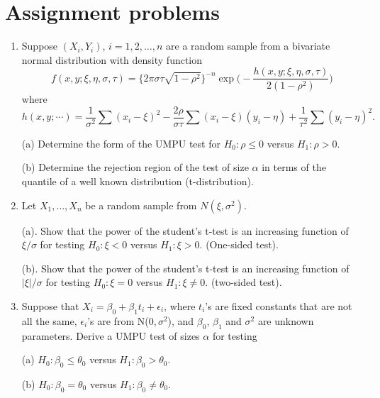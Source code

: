 \section{Assignment problems}
\begin{enumerate}
\item
Suppose $(X_i, Y_i)$, $i=1, 2, \ldots, n$ are a random sample from 
a bivariate normal  distribution with density function
\[
f(x, y; \xi, \eta, \sigma, \tau) 
=
\big \{2\pi \sigma \tau \sqrt{1-\rho^2} \big \}^{-n} 
\exp
\big ( 
- \frac{h(x, y ; \xi, \eta, \sigma, \tau)}{2(1-\rho^2)}
\big )
\]
where
\[
h(x, y ; \cdots)
=
\frac{1}{\sigma^2} \sum(x_i - \xi)^2 
- \frac{2 \rho}{\sigma \tau} \sum(x_i - \xi)(y_i - \eta)
+ \frac{1}{\tau^2}\sum (y_i - \eta)^2.
\]

(a) Determine the form of the UMPU test for $H_0: \rho \leq 0$ 
versus $H_1: \rho > 0$.

(b) Determine the rejection region of the
test of size $\alpha$ in terms of the quantile of 
a well known distribution (t-distribution).

\item
Let $X_1, \ldots, X_n$ be a random sample from $N(\xi, \sigma^2)$. 

(a).
Show that the power of the student's t-test is an increasing function of 
$\xi/\sigma$ for testing $H_0: \xi < 0$ versus $H_1: \xi > 0$. (One-sided test).

(b).
Show that the power of the student's t-test is an increasing function of 
$|\xi|/\sigma$  for testing $H_0: \xi = 0$ versus $H_1: \xi \neq 0$. (two-sided test).

\item
Suppose that $X_i = \beta_0 + \beta_1 t_i + \epsilon_i$,
where $t_i$'s are fixed constants that are not all the same,
$\epsilon_i$'s are \iid from N($0, \sigma^2$),
and $\beta_0$, $\beta_1$ and $\sigma^2$ are unknown
parameters. Derive a UMPU test of sizes $\alpha$
for testing

(a) $H_0: \beta_0 \leq \theta_0$ versus $H_1: \beta_0 > \theta_0$.

(b) $H_0: \beta_0 = \theta_0$ versus $H_1: \beta_0 \neq \theta_0$.

\end{enumerate}

\endinput

\ifstudents\endinput\fi


{\bf Solution to Problem 1}
\vs
{\bf Solution of (a)}.
The key is to write the joint density into the form of
\[
\exp\{ \theta U + \lambda T + A\}
\]
where $A$ is a function of parameters not dependent on data,
$U$ and $V$ are statistics (not dependent on parameters).

